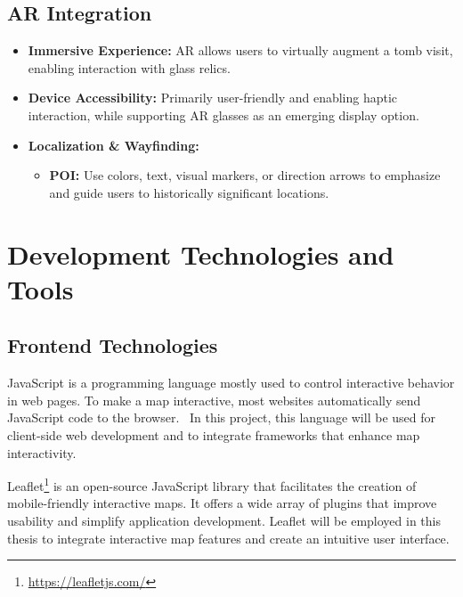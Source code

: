 \subsection*{\gls{AR} Integration}
\begin{itemize}
    \item \textbf{Immersive Experience:} \gls{AR} allows users to virtually augment a tomb visit, enabling interaction with glass relics.
    \item \textbf{Device Accessibility:} Primarily user-friendly and enabling haptic interaction, while supporting \gls{AR} glasses as an emerging display option.
    \item \textbf{Localization \& Wayfinding:} 
    \begin{itemize}
        \item \textbf{\gls{POI}:} Use colors, text, visual markers, or direction arrows to emphasize and guide users to historically significant locations.
    \end{itemize}
\end{itemize}



\section{Development Technologies and Tools}
\label{sec:technologies}


\subsection{Frontend Technologies}
\label{sec:frontend}

JavaScript is a programming language mostly used to control interactive behavior in web
pages. To make a map interactive, most websites automatically send JavaScript code to the browser.~\cite{ajayi2024utilizing} In this project, this language will be used for client-side web development and to integrate frameworks that enhance map interactivity.

Leaflet\footnote{\url{https://leafletjs.com/}} is an open-source JavaScript library that facilitates the creation of mobile-friendly interactive maps. It offers a wide array of plugins that improve usability and simplify application development.
Leaflet will be employed in this thesis to integrate interactive map features and create an intuitive user interface.

